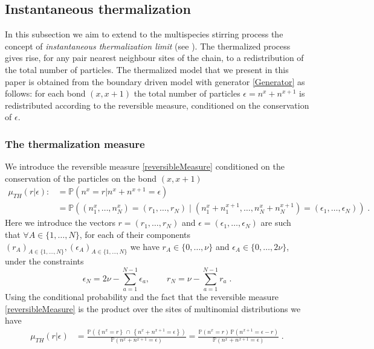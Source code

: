 \documentclass[10pt]{article}
\numberwithin{equation}{section}
\numberwithin{equation}{subsection}
\newcommand{\dt}{\;.}
\newcommand{\fra}[1]{\textcolor[rgb]{0,0,1}{#1}}
\begin{document}
{\subsection{Instantaneous thermalization}\label{Subsection-Thermalized}
In this subsection we aim to extend to the multispecies stirring process the concept of \textit{instantaneous thermalization limit} (see \cite{carinci2013duality,KMP}). The thermalized process gives rise, for any pair nearest neighbour sites of the chain, to a redistribution of the total number of particles. The thermalized model that we present in this paper is obtained from the boundary driven model with generator \eqref{Generator} as follows: for each bond $(x,x+1)$ the total number of particles $\epsilon=n^{x}+n^{x+1}$ is redistributed according to the reversible measure, conditioned on the conservation of $\epsilon$. 
\subsubsection{The thermalization measure}
We introduce the reversible measure \eqref{reversibleMeasure} conditioned on the conservation of the particles on the bond $(x,x+1)$
\begin{align}
	\mu_{TH}(r|\epsilon):&=\mathbb{P}\left(n^{x}=r|n^{x}+n^{x+1}=\epsilon\right)\nonumber
	\\&
	=\mathbb{P}\left((n_{1}^{x},\ldots,n_{N}^{x})=
	(r_{1},\ldots,r_{N})\;|\;(n_{1}^{x}+n_{1}^{x+1},\ldots,n_{N}^{x}+n_{N}^{x+1})=(\epsilon_{1},\ldots,\epsilon_{N})\right)\dt
\end{align}
\fra{Here we introduce the vectors $r=(r_{1},\ldots,r_{N})$ and  $\epsilon=(\epsilon_{1},\ldots,\epsilon_{N})$ are such that $\forall A\in\{1,\ldots,N\}$, for each of their components $(r_{A})_{A\in\{1,\ldots,N\}},(\epsilon_{A})_{A\in\{1,\ldots,N\}}$ we have $r_{A}\in \{0,\ldots,\nu\}$ and $\epsilon_{A}\in \{0,\ldots,2\nu\}$, under the constraints 
\begin{equation}
	\epsilon_{N}=2\nu-\sum_{a=1}^{N-1}\epsilon_{a},\qquad r_{N}=\nu-\sum_{a=1}^{N-1}r_{a}\dt
\end{equation}}
 Using the conditional probability and the fact that the reversible measure \eqref{reversibleMeasure} is the product over the sites of multinomial distributions we have
\begin{equation}
	\begin{split}
\mu_{TH}(r|\epsilon)&=\frac{\mathbb{P}\left(\left\{n^{x}=r\right\}\,\cap\,\left\{n^{x}+n^{x+1}=\epsilon\right\}\right)}{\mathbb{P}\left(n^{x}+n^{x+1}=\epsilon\right)}=\frac{\mathbb{P}\left(n^{x}=r\right)\,\mathbb{P}\left(n^{x+1}=\epsilon-r\right)}{\mathbb{P}\left(n^{x}+n^{x+1}=\epsilon\right)}\dt

\end{split}
\end{equation}}
\end{document}
